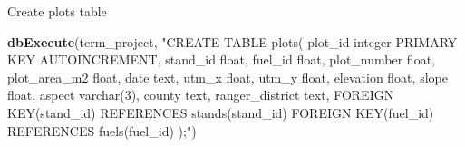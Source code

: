 \documentclass[]{book}
\newenvironment{Shaded}{\begin{snugshade}}{\end{snugshade}}
\newcommand{\KeywordTok}[1]{\textcolor[rgb]{0.13,0.29,0.53}{\textbf{#1}}}
\newcommand{\NormalTok}[1]{#1}
\newcommand{\StringTok}[1]{\textcolor[rgb]{0.31,0.60,0.02}{#1}}
\begin{document}
Create plots table

\begin{Shaded}
\begin{Highlighting}[]
\KeywordTok{dbExecute}\NormalTok{(term_project, }\StringTok{"CREATE TABLE plots(}
\StringTok{plot_id integer PRIMARY KEY AUTOINCREMENT,}
\StringTok{stand_id float,}
\StringTok{fuel_id float,}
\StringTok{plot_number float,}
\StringTok{plot_area_m2 float,}
\StringTok{date text,}
\StringTok{utm_x float,}
\StringTok{utm_y float,}
\StringTok{elevation float,}
\StringTok{slope float,}
\StringTok{aspect varchar(3),}
\StringTok{county text,}
\StringTok{ranger_district text,}
\StringTok{FOREIGN KEY(stand_id) REFERENCES stands(stand_id)}
\StringTok{FOREIGN KEY(fuel_id) REFERENCES fuels(fuel_id)}
\StringTok{);"}\NormalTok{)}
\end{Highlighting}
\end{Shaded}


\end{document}
